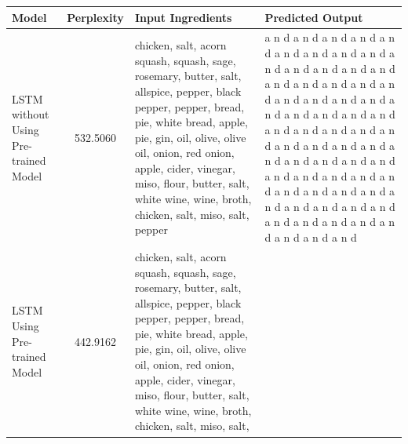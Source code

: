 \documentclass[10pt,twocolumn,letterpaper]{article}
\begin{document}
\begin{table}
    \centering
    \begin{tabular}{|p{2cm}|c|p{5cm}|p{7cm}|}
        \hline
        Model & Perplexity  & Input Ingredients & Predicted Output \\
        \hline\hline
        LSTM without Using Pre-trained Model & 532.5060 & chicken,
        salt,
        acorn squash,
        squash,
        sage,
        rosemary,
        butter,
        salt,
        allspice,
        pepper,
        black pepper,
        pepper,
        bread,
        pie,
        white bread,
        apple,
        pie,
        gin,
        oil,
        olive,
        olive oil,
        onion,
        red onion,
        apple,
        cider,
        vinegar,
        miso,
        flour,
        butter,
        salt,
        white wine,
        wine,
        broth,
        chicken,
        salt,
        miso,
        salt,
        pepper & a n d   a n d   a n d   a n d   a n d   a n d   a n d   a n d   a n d   a n d   a n d   a n d   a n d   a n d   a n d   a n d   a n d   a n d   a n d   a n d   a n d   a n d   a n d   a n d   a n d   a n d   a n d   a n d   a n d   a n d a n d   a n d   a n d   a n d   a n d   a n d   a n d   a n d   a n d   a n d   a n d   a n d   a n d   a n d   a n d   a n d   a n d   a n d   a n d   a n d   a n d   a n d   a n d   a n d   a n d   a n d   a n d   a n d   a n d   a n d   a n d   a n d   a n d   a n d  \\
        LSTM Using Pre-trained Model & 442.9162 & chicken,
        salt,
        acorn squash,
        squash,
        sage,
        rosemary,
        butter,
        salt,
        allspice,
        pepper,
        black pepper,
        pepper,
        bread,
        pie,
        white bread,
        apple,
        pie,
        gin,
        oil,
        olive,
        olive oil,
        onion,
        red onion,
        apple,
        cider,
        vinegar,
        miso,
        flour,
        butter,
        salt,
        white wine,
        wine,
        broth,
        chicken,
        salt,
        miso,
        salt,

\end{tabular}
\end{table}
\end{document}
